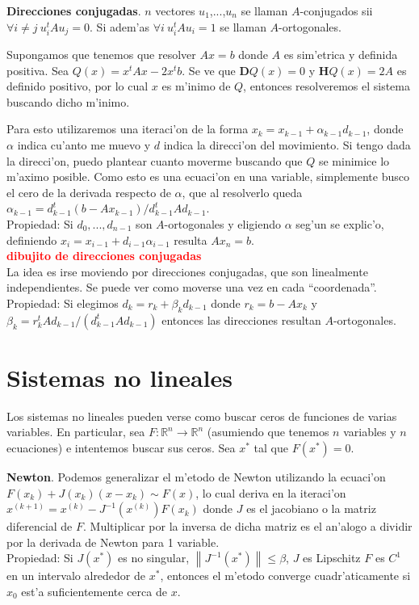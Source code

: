 \documentclass[a4paper,spanish]{article}
\newcommand{\Rv}{\marginpar{\textcolor{red}{$|$}}}
\newcommand{\note}[1]{\textcolor{red}{\textbf{#1}} \Rv}
\newcommand{\R}[0]{\mathbb{R}}
\newcommand{\norma}[1]{\left\|#1\right\|}
\newcommand{\D}[0]{\mathbf{D}}
\newcommand{\He}[0]{\mathbf{H}}
\begin{document}
\textbf{Direcciones conjugadas}. $n$ vectores $u_1$,...,$u_n$ se llaman 
$A$-conjugados sii $\forall i \neq j\ u_i^t A u_j = 0$. Si adem'as
$\forall i\ u_i^t A u_i = 1$ se llaman $A$-ortogonales.

Supongamos que tenemos que resolver $Ax=b$ donde $A$ es sim'etrica y definida
positiva. Sea $Q(x) = x^t A x - 2 x^t b$. Se ve que $\D Q(x) = 0$ y 
$\He Q(x) = 2A$ es definido positivo, por lo cual $x$ es m'inimo de $Q$,
entonces resolveremos el sistema buscando dicho m'inimo.

Para esto utilizaremos una iteraci'on de la forma 
$x_k = x_{k-1} + \alpha_{k-1} d_{k-1}$, donde $\alpha$ indica cu'anto me muevo
y $d$ indica la direcci'on del movimiento. Si tengo dada la direcci'on, puedo
plantear cuanto moverme buscando que $Q$ se minimice lo m'aximo posible. Como
esto es una ecuaci'on en una variable, simplemente busco el cero de la
derivada respecto de $\alpha$, que al resolverlo queda
$\alpha_{k-1} = d_{k-1}^t(b-Ax_{k-1}) / d_{k-1}^tAd_{k-1}$. \\
Propiedad: Si $d_0,...,d_{n-1}$ son $A$-ortogonales y eligiendo $\alpha$
seg'un se explic'o, definiendo $x_i = x_{i-1} + d_{i-1} \alpha_{i-1}$ resulta 
$Ax_n = b$. \\
\note{dibujito de direcciones conjugadas} \\
La idea es irse moviendo por direcciones conjugadas, que son linealmente
independientes. Se puede ver como moverse una vez en cada ``coordenada''. \\
Propiedad: Si elegimos $d_k = r_k + \beta_k d_{k-1}$ donde $r_k = b-Ax_k$ y
$\beta_k = r_k^t A d_{k-1} / ( d_{k-1}^t A d_{k-1} )$ entonces las direcciones
resultan $A$-ortogonales.

\section{Sistemas no lineales}

Los sistemas no lineales pueden verse como buscar ceros de funciones de varias
variables. En particular, sea $F: \R^n \to \R^n$ (asumiendo que tenemos $n$
variables y $n$ ecuaciones) e intentemos buscar sus ceros. Sea $x^*$ tal que
$F(x^*)=0$.

\textbf{Newton}. Podemos generalizar el m'etodo de Newton utilizando la
ecuaci'on $F(x_k) + J(x_k)(x - x_k) \sim F(x)$, lo cual deriva en la 
iteraci'on $x^{(k+1)} = x^{(k)} - J^{-1}(x^{(k)})F(x_k)$ donde $J$ es el
jacobiano o la matriz diferencial de $F$. Multiplicar por la inversa de dicha
matriz es el an'alogo a dividir por la derivada de Newton para 1 variable. \\
Propiedad: Si $J(x^*)$ es no singular, $\norma{J^{-1}(x^*)} \leq \beta$, $J$
es Lipschitz $F$ es $C^1$ en un intervalo alrededor de $x^*$, entonces
el m'etodo converge cuadr'aticamente si $x_0$ est'a suficientemente cerca de
$x$.
\end{document}
